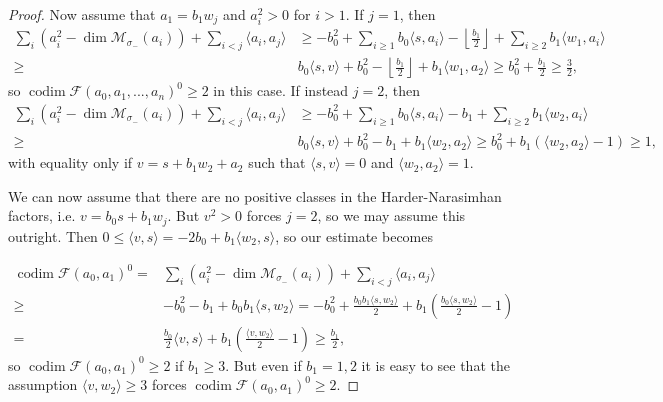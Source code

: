 \documentclass[leqno,11pt]{amsart}
\def\codim{\mathop{\mathrm{codim}}\nolimits}
\def\dim{\mathop{\mathrm{dim}}\nolimits}
\theoremstyle{definition}
\def\FF{\ensuremath{\mathcal F}}
\def\MM{\ensuremath{\mathcal M}}
\begin{document}
\begin{proof}
Now assume that $a_1=b_1 w_j$ and $a_i^2>0$ for $i>1$.  If $j=1$, then 
 \begin{equation}
\begin{split}
 \sum_i (a_i^2-\dim \MM_{\sigma_-}(a_i))+\sum_{i<j}\langle a_i,a_j \rangle
&\geq  -b_0^2+\sum_{i \geq 1}b_0 \langle s,a_i \rangle
-\left\lfloor\frac{b_1}{2}\right\rfloor+\sum_{i \geq 2} b_1 \langle w_1,a_i \rangle\\
\geq & b_0 \langle s,v \rangle+b_0^2
-\left\lfloor\frac{b_1}{2}\right\rfloor+b_1 \langle w_1,a_2 \rangle 
\geq  b_0^2+\frac{b_1}{2} \geq \frac{3}{2},
\end{split}
\end{equation}
so $\codim\FF(a_0,a_1,...,a_n)^0\geq 2$ in this case.  If instead $j=2$, then 
 \begin{equation}
\begin{split}
 \sum_i (a_i^2-\dim \MM_{\sigma_-}(a_i))+\sum_{i<j}\langle a_i,a_j \rangle
&\geq  -b_0^2+\sum_{i \geq 1}b_0 \langle s,a_i \rangle
-b_1+\sum_{i \geq 2} b_1 \langle w_2,a_i \rangle\\
\geq & b_0 \langle s,v \rangle+b_0^2
-b_1+b_1 \langle w_2,a_2 \rangle 
\geq  b_0^2+b_1(\langle w_2,a_2\rangle-1)\geq 1,
\end{split}
\end{equation}
with equality only if $v=s+b_1w_2+a_2$ such that $\langle s,v\rangle=0$ and $\langle w_2,a_2\rangle=1$.  

We can now assume that there are no positive classes in the Harder-Narasimhan factors, i.e. $v=b_0 s+b_1 w_j$.  But $v^2>0$ forces $j=2$, so we may assume this outright.  Then $0 \leq \langle v,s \rangle=-2b_0+b_1 \langle w_2,s \rangle$, so our estimate becomes 

 \begin{equation}\label{eq: spherical 1,2 case I, c}
\begin{split}
\codim\FF(a_0,a_1)^0=&\sum_i (a_i^2-\dim \MM_{\sigma_-}(a_i))+\sum_{i<j}\langle a_i,a_j \rangle\\
\geq & -b_0^2-b_1+b_0b_1\langle s,w_2\rangle=-b_0^2+\frac{b_0b_1\langle s,w_2\rangle}{2}+b_1\left(\frac{b_0\langle s,w_2\rangle}{2}-1\right)\\
= & \frac{b_0}{2}\langle v,s\rangle+b_1\left(\frac{\langle v,w_2\rangle}{2}-1\right)\geq\frac{b_1}{2},
\end{split}
\end{equation}
so $\codim\FF(a_0,a_1)^0\geq 2$ if $b_1\geq 3$.  But even if $b_1=1,2$ it is easy to see that the assumption $\langle v,w_2\rangle\geq 3$ forces $\codim\FF(a_0,a_1)^0\geq 2$.  


\end{proof}
\end{document}
